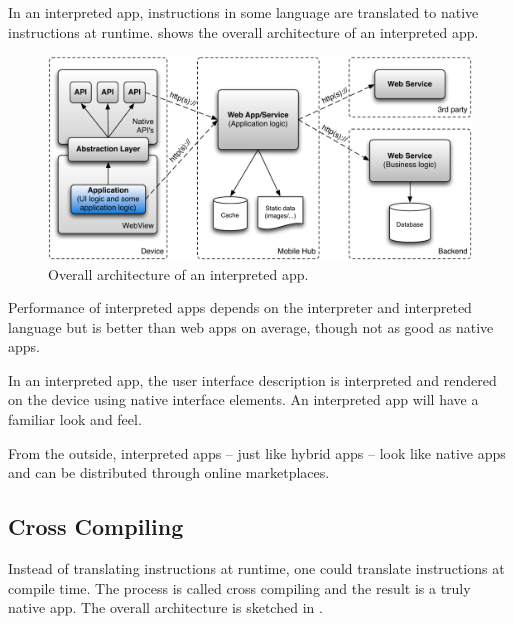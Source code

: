 \npar In an interpreted app, instructions in some language are translated to native instructions at runtime.  shows the overall architecture of an interpreted app.

\begin{figure}[h!]
    \begin{center}
        \includegraphics[width=\textwidth]{figs/interpreted.pdf}
        \caption{
            Overall architecture of an interpreted app.
        }
        \label{fig:interpreted}
    \end{center}
\end{figure}

\npar Performance of interpreted apps depends on the interpreter and interpreted language but is better than web apps on average, though not as good as native apps. 

\npar In an interpreted app, the user interface description is interpreted and rendered on the device using native interface elements. An interpreted app will have a familiar look and feel.

\npar From the outside, interpreted apps -- just like hybrid apps -- look like native apps and can be distributed through online marketplaces.

\subsection{Cross Compiling}

\npar Instead of translating instructions at runtime, one could translate instructions at compile time. The process is called cross compiling and the result is a truly native app. The overall architecture is sketched in . 

